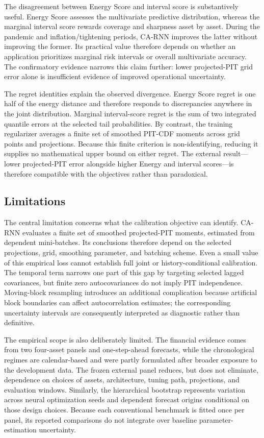 \documentclass[11pt]{article}
\begin{document}
The disagreement between Energy Score and interval score is substantively useful.
Energy Score assesses the multivariate predictive distribution, whereas the
marginal interval score rewards coverage and sharpness asset by asset. During the
pandemic and inflation/tightening periods, CA-RNN improves the latter
without improving the former. Its practical value therefore depends on whether an
application prioritizes marginal risk intervals or overall multivariate accuracy.
The confirmatory evidence narrows this claim further: lower projected-PIT grid
error alone is insufficient evidence of improved operational uncertainty.

The regret identities explain the observed divergence. Energy Score regret is
one half of the energy distance and therefore responds to discrepancies anywhere
in the joint distribution. Marginal interval-score regret is the sum of two
integrated quantile errors at the selected tail probabilities. By contrast, the
training regularizer averages a finite set of smoothed PIT-CDF moments across
grid points and projections. Because this finite criterion is non-identifying,
reducing it supplies no mathematical upper bound on either regret. The external
result---lower projected-PIT error alongside higher Energy and interval
scores---is therefore compatible with the objectives rather than paradoxical.

\subsection{Limitations}

The central limitation concerns what the calibration objective can identify.
CA-RNN evaluates a finite set of smoothed projected-PIT moments, estimated from
dependent mini-batches. Its conclusions therefore depend on the selected
projections, grid, smoothing parameter, and batching scheme. Even a small value
of this empirical loss cannot establish full joint or history-conditional
calibration. The temporal term narrows one part of this gap by targeting selected
lagged covariances, but finite zero autocovariances do not imply PIT independence.
Moving-block resampling introduces an additional complication because artificial
block boundaries can affect autocorrelation estimates; the corresponding
uncertainty intervals are consequently interpreted as diagnostic rather than
definitive.

The empirical scope is also deliberately limited. The financial evidence comes
from two four-asset panels and one-step-ahead forecasts, while the chronological
regimes are calendar-based and were partly formulated after broader exposure to
the development data. The frozen external panel reduces, but does not eliminate,
dependence on choices of assets, architecture, tuning path, projections, and
evaluation windows. Similarly, the hierarchical bootstrap represents variation
across neural optimization seeds and dependent forecast origins conditional on
those design choices. Because each conventional benchmark is fitted once per
panel, its reported comparisons do not integrate over baseline parameter-
estimation uncertainty.
\end{document}
